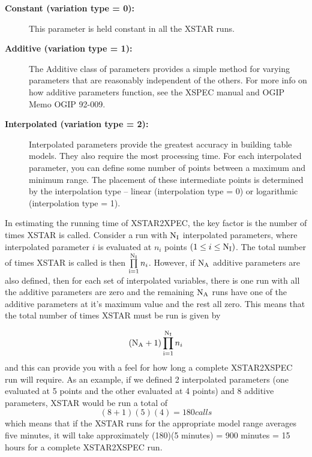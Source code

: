 \begin{description}
	\item[{\bf Constant (variation type = 0):}]  This parameter is held 
	constant in all the XSTAR runs.

	\item[{\bf Additive (variation type = 1):}]  The Additive class of 
	parameters provides a 
	simple method for varying parameters that are reasonably 
	independent of the others.  For more info on how additive parameters 
	function, see the XSPEC manual and OGIP Memo OGIP 92-009.

	\item[{\bf Interpolated (variation type = 2):}]  Interpolated parameters 
	provide the 
	greatest accuracy in building table models.  They also require the 
	most processing time.  For each interpolated parameter, you can 
	define some number of points between a maximum and minimum range.  
	The placement of these intermediate points is determined by the 
	interpolation type -- linear (interpolation type = 0) or 
	logarithmic (interpolation type = 1).
	
\end{description}

In estimating the running time of XSTAR2XPEC, the key factor is the 
number of times XSTAR is called.  Consider a run with ${\rm N}_{\rm I}$ 
interpolated parameters, where interpolated parameter $i$ is evaluated 
at $n_{i}$ points $(1 \leq i \leq {\rm N}_{\rm I})$.  The total number of 
times XSTAR is called is then $\prod\limits_{\rm i=1}^{{\rm N}_{\rm 
I}} n_i$.  However, if ${\rm N}_{\rm A}$ additive parameters are also 
defined, then for each set of interpolated variables, there is one 
run with all the additive parameters are zero and the remaining ${\rm 
N}_{\rm A}$ runs have one of the additive parameters at it's maximum 
value and the rest all zero.  This means that the total number of 
times XSTAR must be run is given by

\begin{equation}
	({\rm N}_{\rm A}+1) \prod\limits_{\rm i=1}^{{\rm N}_{\rm I}} n_i
\end{equation}
and this can provide you with a feel for how long a complete 
XSTAR2XSPEC run will require.  As an example, if we defined 2 
interpolated parameters (one evaluated at 5 points and the other 
evaluated at 4 points) and 8 additive parameters, XSTAR would be run a 
total of
\begin{equation}
	(8+1)(5)(4) = 180 calls
\end{equation}
which means that if the XSTAR runs for the appropriate model range 
averages five minutes, it will take approximately (180)(5 minutes) = 
900 minutes = 15 hours for a complete XSTAR2XSPEC run.

